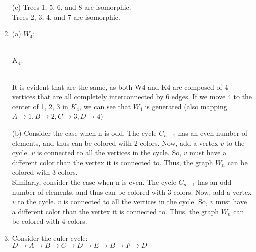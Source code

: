 \documentclass[a4paper]{article}
\begin{document}
\begin{enumerate}
    (c) Trees 1, 5, 6, and 8 are isomorphic. \\
    Trees 2, 3, 4, and 7 are isomorphic.\\


    \item (a) $W_4$: 
      \\
      $K_4$: 
       \\

  It is evident that are the same, as both W4 and K4 are composed of 4 vertices that are all completely interconnected by 6 edges. If we move 4 to the center of 1, 2, 3 in $K_4$, we can see that $W_4$ is generated (also mapping $A \rightarrow 1, B \rightarrow 2, C \rightarrow 3,D \rightarrow 4$)


  (b) Consider the case when n is odd. The cycle $C_{n-1}$ has an even number of elements, and thus can be colored with 2 colors. Now, add a vertex $v$ to the cycle. $v$ is connected to all the vertices in the cycle. So, $v$ must have a different color than the vertex it is connected to. Thus, the graph $W_n$ can be colored with 3 colors.\\

  Similarly, consider the case when n is even. The cycle $C_{n-1}$ has an odd number of elements, and thus can be colored with 3 colors. Now, add a vertex $v$ to the cycle. $v$ is connected to all the vertices in the cycle. So, $v$ must have a different color than the vertex it is connected to. Thus, the graph $W_n$ can be colored with 4 colors.\\

  \item Consider the euler cycle:\\
  $D \rightarrow A \rightarrow B \rightarrow C \rightarrow D \rightarrow E \rightarrow B \rightarrow F \rightarrow D$\\


\end{enumerate}
\end{document}

